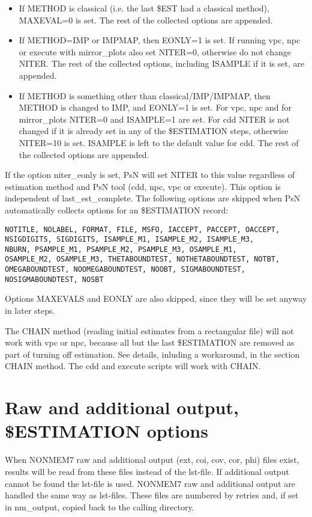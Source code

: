 \begin{itemize}
	\item If METHOD is classical (i.e. the last \$EST had a classical method), MAXEVAL=0 is set. The rest of the collected options are appended.
	\item If METHOD=IMP or IMPMAP, then EONLY=1 is set. If running vpc, npc or execute with mirror\_plots also set NITER=0, otherwise do not change NITER. The rest of the collected options, including ISAMPLE if it is set, are appended. 
	\item If METHOD is something other than classical/IMP/IMPMAP, then METHOD is changed to IMP, and EONLY=1 is set. For vpc, npc and for mirror\_plots NITER=0 and ISAMPLE=1 are set. For cdd NITER is not changed if it is already set in any of the \$ESTIMATION steps, otherwise NITER=10 is set. ISAMPLE is left to the default value for cdd. The rest of the collected options are appended.
\end{itemize}

If the option niter\_eonly is set, PsN will set NITER to this value regardless of estimation method and PsN tool (cdd, npc, vpc or execute). This option is independent of last\_est\_complete.
The following options are skipped when PsN automatically collects options for an \$ESTIMATION record:
\begin{verbatim}
NOTITLE, NOLABEL, FORMAT, FILE, MSFO, IACCEPT, PACCEPT, OACCEPT,
NSIGDIGITS, SIGDIGITS, ISAMPLE_M1, ISAMPLE_M2, ISAMPLE_M3,
NBURN, PSAMPLE_M1, PSAMPLE_M2, PSAMPLE_M3, OSAMPLE_M1,
OSAMPLE_M2, OSAMPLE_M3, THETABOUNDTEST, NOTHETABOUNDTEST, NOTBT,
OMEGABOUNDTEST, NOOMEGABOUNDTEST, NOOBT, SIGMABOUNDTEST,
NOSIGMABOUNDTEST, NOSBT
\end{verbatim}
Options MAXEVALS and EONLY are also skipped, since they will be set anyway in later steps.

The CHAIN method (reading initial estimates from a rectangular file) will not work with vpc or npc, because all but the last \$ESTIMATION are removed as part of turning off estimation. See details, inluding a workaround, in the section CHAIN method. The cdd and execute scripts will work with CHAIN.


\section{Raw and additional output, \$ESTIMATION options}

When NONMEM7 raw and additional output (ext, coi, cov, cor, phi) files exist, 
results will be read from these files instead of the lst-file. 
If additional output cannot be found the lst-file is used. NONMEM7 raw and additional output are handled the same way as lst-files. These files are numbered by retries and, if set in nm\_output, copied back to the calling directory.


